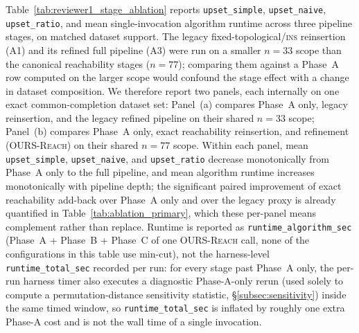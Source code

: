 \documentclass{article}
\begin{document}
Table~\ref{tab:reviewer1_stage_ablation} reports \texttt{upset\_simple}, \texttt{upset\_naive}, \texttt{upset\_ratio}, and mean single-invocation algorithm runtime across three pipeline stages, on matched dataset support.
The legacy fixed-topological/\textsc{ins} reinsertion (A1) and its refined full pipeline (A3) were run on a smaller $n=33$ scope than the canonical reachability stages ($n=77$); comparing them against a Phase~A row computed on the larger scope would confound the stage effect with a change in dataset composition.
We therefore report two panels, each internally on one exact common-completion dataset set: Panel~(a) compares Phase~A only, legacy reinsertion, and the legacy refined pipeline on their shared $n=33$ scope; Panel~(b) compares Phase~A only, exact reachability reinsertion, and refinement (\textsc{OURS-Reach}) on their shared $n=77$ scope.
Within each panel, mean \texttt{upset\_simple}, \texttt{upset\_naive}, and \texttt{upset\_ratio} decrease monotonically from Phase~A only to the full pipeline, and mean algorithm runtime increases monotonically with pipeline depth; the significant paired improvement of exact reachability add-back over Phase~A only and over the legacy proxy is already quantified in Table~\ref{tab:ablation_primary}, which these per-panel means complement rather than replace.
Runtime is reported as \texttt{runtime\_algorithm\_sec} (Phase~A + Phase~B + Phase~C of one \textsc{OURS-Reach} call, none of the configurations in this table use min-cut), not the harness-level \texttt{runtime\_total\_sec} recorded per run: for every stage past Phase~A only, the per-run harness timer also executes a diagnostic Phase-A-only rerun (used solely to compute a permutation-distance sensitivity statistic, \S\ref{subsec:sensitivity}) inside the same timed window, so \texttt{runtime\_total\_sec} is inflated by roughly one extra Phase-A cost and is not the wall time of a single invocation.
\end{document}
